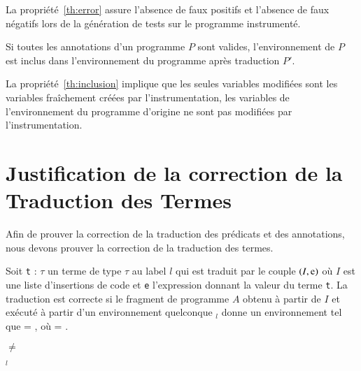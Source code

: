 La propriété~\ref{th:error} assure l'absence de faux positifs et l'absence de
faux négatifs lors de la génération de tests sur le programme instrumenté.

\begin{myproperty}
  \label{th:inclusion}
  Si toutes les annotations d'un programme $P$ sont valides, l'environnement de
  $P$ est inclus dans l'environnement du programme après traduction $P'$.
\end{myproperty}


La propriété~\ref{th:inclusion} implique que les seules variables modifiées sont
les variables fraîchement créées par l'instrumentation, les variables de
l'environnement du programme d'origine ne sont pas modifiées par
l'instrumentation.


\section{Justification de la correction de la Traduction des Termes}
\label{sec:term-translation}

Afin de prouver la correction de la traduction des prédicats et des annotations,
nous devons prouver la correction de la traduction des termes.

\begin{myproperty}
  \label{lem:term-correct}
  Soit \lstinline't' : $\tau$ un terme de type $\tau$ au label $l$ qui est
  traduit par le couple $(I, \mbox{\lstinline'e'})$ où $I$ est une liste
  d'insertions de code et \lstinline'e' l'expression donnant la valeur du terme
  \lstinline't'.
  La traduction est correcte si le fragment de programme $A$ obtenu à partir de
  $I$ et exécuté à partir d'un environnement quelconque \env$_l$ donne un
  environnement \env{} tel que
   = , où
  \env = .
\end{myproperty}

\begin{myproperty}
  \label{lem:term-noerror}
  \env $\neq$ \errorenv
\end{myproperty}

\begin{myproperty}
  \label{lem:term-subset}
  \env$_l$ \subenv{} \env
\end{myproperty}

